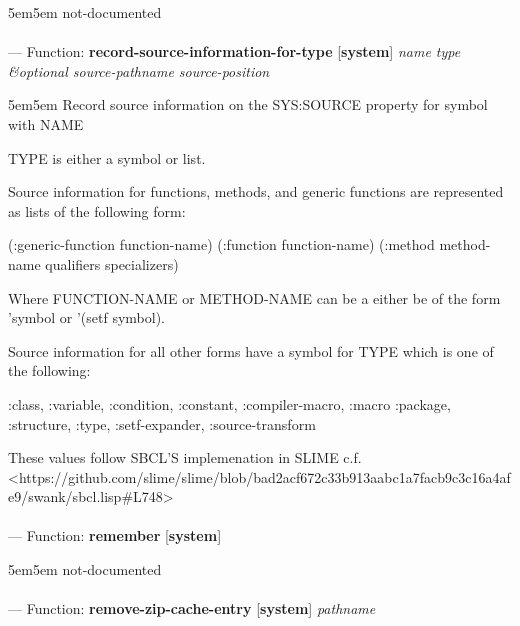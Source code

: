 \begin{adjustwidth}{5em}{5em}
not-documented
\end{adjustwidth}

\paragraph{}
\label{SYSTEM:RECORD-SOURCE-INFORMATION-FOR-TYPE}
--- Function: \textbf{record-source-information-for-type} [\textbf{system}] \textit{name type \&optional source-pathname source-position}

\begin{adjustwidth}{5em}{5em}
Record source information on the SYS:SOURCE property for symbol with NAME

TYPE is either a symbol or list.

Source information for functions, methods, and generic functions are
represented as lists of the following form:

    (:generic-function function-name)
    (:function function-name)
    (:method method-name qualifiers specializers)

Where FUNCTION-NAME or METHOD-NAME can be a either be of the form
'symbol or '(setf symbol).

Source information for all other forms have a symbol for TYPE which is
one of the following:

:class, :variable, :condition, :constant, :compiler-macro, :macro
:package, :structure, :type, :setf-expander, :source-transform

These values follow SBCL'S implemenation in SLIME
c.f. <https://github.com/slime/slime/blob/bad2acf672c33b913aabc1a7facb9c3c16a4afe9/swank/sbcl.lisp\#L748>


\end{adjustwidth}

\paragraph{}
\label{SYSTEM:REMEMBER}
--- Function: \textbf{remember} [\textbf{system}] \textit{}

\begin{adjustwidth}{5em}{5em}
not-documented
\end{adjustwidth}

\paragraph{}
\label{SYSTEM:REMOVE-ZIP-CACHE-ENTRY}
--- Function: \textbf{remove-zip-cache-entry} [\textbf{system}] \textit{pathname}

